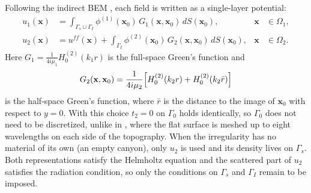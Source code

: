 \documentclass[11pt,twoside]{article}
\begin{document}
Following the indirect BEM \citep{SanchezSesma1991,wu_novel_2026}, each field is written as a single-layer potential:
\begin{align*}
  u_1(\mathbf{x}) &= \int_{\Gamma_s\cup\Gamma_I}
     \phi^{(1)}(\mathbf{x}_0)\, G_1(\mathbf{x},\mathbf{x}_0)\, dS(\mathbf{x}_0),
     & \mathbf{x}&\in\Omega_1,\\
  u_2(\mathbf{x}) &= u^{f\!f}(\mathbf{x}) + \int_{\Gamma_I}
     \phi^{(2)}(\mathbf{x}_0)\, G_2(\mathbf{x},\mathbf{x}_0)\, dS(\mathbf{x}_0),
     & \mathbf{x}&\in\Omega_2.
\end{align*}
Here $G_1 = \frac{1}{4i\mu_1}H_0^{(2)}(k_1 r)$ is the full-space Green's function and
\begin{equation*}
  G_2(\mathbf{x},\mathbf{x}_0) = \frac{1}{4i\mu_2}\Bigl[H_0^{(2)}(k_2 r) + H_0^{(2)}(k_2 \bar r)\Bigr]
\end{equation*}
is the half-space Green's function, where $\bar r$ is the distance to the image of $\mathbf{x}_0$ with respect to $y=0$. With this choice $t_2=0$ on $\Gamma_0$ holds identically, so $\Gamma_0$ does not need to be discretized, unlike in \citet{wu_novel_2026}, where the flat surface is meshed up to eight wavelengths on each side of the topography. When the irregularity has no material of its own (an empty canyon), only $u_2$ is used and its density lives on $\Gamma_s$. Both representations satisfy the Helmholtz equation and the scattered part of $u_2$ satisfies the radiation condition, so only the conditions on $\Gamma_s$ and $\Gamma_I$ remain to be imposed.
\end{document}
